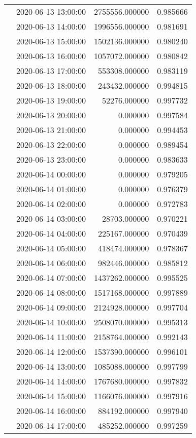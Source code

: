 \begin{tabular}{llrr}
 & 2020-06-13 13:00:00 & 2755556.000000 & 0.985666 \\
 & 2020-06-13 14:00:00 & 1996556.000000 & 0.981691 \\
 & 2020-06-13 15:00:00 & 1502136.000000 & 0.980240 \\
 & 2020-06-13 16:00:00 & 1057072.000000 & 0.980842 \\
 & 2020-06-13 17:00:00 & 553308.000000 & 0.983119 \\
 & 2020-06-13 18:00:00 & 243432.000000 & 0.994815 \\
 & 2020-06-13 19:00:00 & 52276.000000 & 0.997732 \\
 & 2020-06-13 20:00:00 & 0.000000 & 0.997584 \\
 & 2020-06-13 21:00:00 & 0.000000 & 0.994453 \\
 & 2020-06-13 22:00:00 & 0.000000 & 0.989454 \\
 & 2020-06-13 23:00:00 & 0.000000 & 0.983633 \\
 & 2020-06-14 00:00:00 & 0.000000 & 0.979205 \\
 & 2020-06-14 01:00:00 & 0.000000 & 0.976379 \\
 & 2020-06-14 02:00:00 & 0.000000 & 0.972783 \\
 & 2020-06-14 03:00:00 & 28703.000000 & 0.970221 \\
 & 2020-06-14 04:00:00 & 225167.000000 & 0.970439 \\
 & 2020-06-14 05:00:00 & 418474.000000 & 0.978367 \\
 & 2020-06-14 06:00:00 & 982446.000000 & 0.985812 \\
 & 2020-06-14 07:00:00 & 1437262.000000 & 0.995525 \\
 & 2020-06-14 08:00:00 & 1517168.000000 & 0.997889 \\
 & 2020-06-14 09:00:00 & 2124928.000000 & 0.997704 \\
 & 2020-06-14 10:00:00 & 2508070.000000 & 0.995313 \\
 & 2020-06-14 11:00:00 & 2158764.000000 & 0.992143 \\
 & 2020-06-14 12:00:00 & 1537390.000000 & 0.996101 \\
 & 2020-06-14 13:00:00 & 1085088.000000 & 0.997799 \\
 & 2020-06-14 14:00:00 & 1767680.000000 & 0.997832 \\
 & 2020-06-14 15:00:00 & 1166076.000000 & 0.997916 \\
 & 2020-06-14 16:00:00 & 884192.000000 & 0.997940 \\
 & 2020-06-14 17:00:00 & 485252.000000 & 0.997259 \\

\end{tabular}
